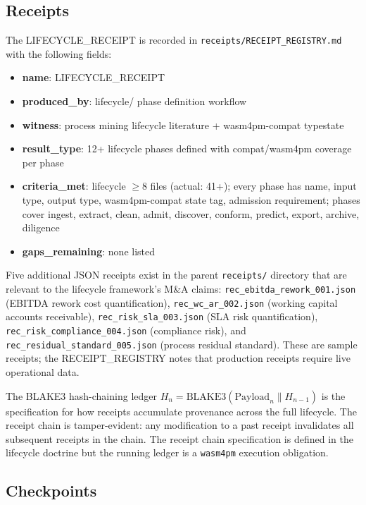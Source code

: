 \subsection{Receipts}
\label{sec:lifecycle-evidence-receipts}

The LIFECYCLE\_RECEIPT is recorded in \texttt{receipts/RECEIPT\_REGISTRY.md} with the
following fields:

\begin{itemize}
  \item \textbf{name}: LIFECYCLE\_RECEIPT
  \item \textbf{produced\_by}: lifecycle/ phase definition workflow
  \item \textbf{witness}: process mining lifecycle literature + wasm4pm-compat typestate
  \item \textbf{result\_type}: 12+ lifecycle phases defined with compat/wasm4pm coverage
    per phase
  \item \textbf{criteria\_met}: lifecycle $\geq 8$ files (actual: 41+); every phase has
    name, input type, output type, wasm4pm-compat state tag, admission requirement;
    phases cover ingest, extract, clean, admit, discover, conform, predict, export,
    archive, diligence
  \item \textbf{gaps\_remaining}: none listed
\end{itemize}

Five additional JSON receipts exist in the parent \texttt{receipts/} directory that
are relevant to the lifecycle framework's M\&A claims:
\texttt{rec\_ebitda\_rework\_001.json} (EBITDA rework cost quantification),
\texttt{rec\_wc\_ar\_002.json} (working capital accounts receivable),
\texttt{rec\_risk\_sla\_003.json} (SLA risk quantification),
\texttt{rec\_risk\_compliance\_004.json} (compliance risk), and
\texttt{rec\_residual\_standard\_005.json} (process residual standard). These are
sample receipts; the RECEIPT\_REGISTRY notes that production receipts require live
operational data.

The BLAKE3 hash-chaining ledger $H_n = \mathrm{BLAKE3}(\mathrm{Payload}_n \parallel
H_{n-1})$ is the specification for how receipts accumulate provenance across the full
lifecycle. The receipt chain is tamper-evident: any modification to a past receipt
invalidates all subsequent receipts in the chain. The receipt chain specification is
defined in the lifecycle doctrine but the running ledger is a \texttt{wasm4pm}
execution obligation.

\subsection{Checkpoints}
\label{sec:lifecycle-evidence-checkpoints}

